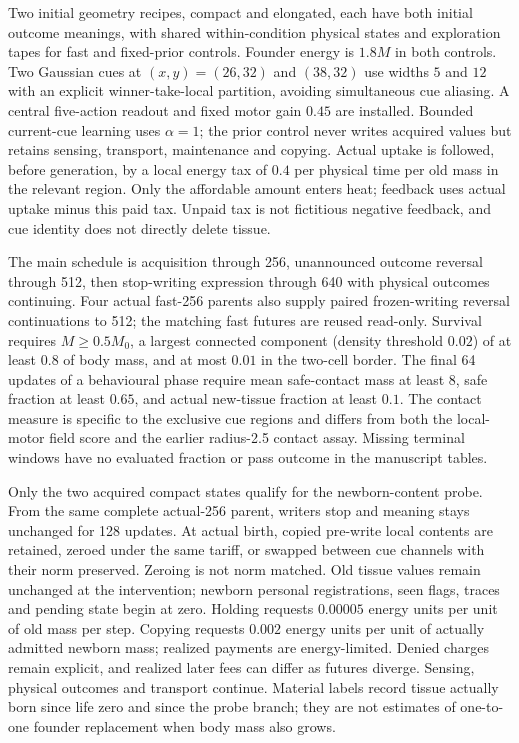 Two initial geometry recipes, compact and elongated, each have both initial outcome meanings, with shared within-condition physical states and exploration tapes for fast and fixed-prior controls. Founder energy is $1.8M$ in both controls. Two Gaussian cues at $(x,y)=(26,32)$ and $(38,32)$ use widths $5$ and $12$ with an explicit winner-take-local partition, avoiding simultaneous cue aliasing. A central five-action readout and fixed motor gain $0.45$ are installed. Bounded current-cue learning uses $\alpha=1$; the prior control never writes acquired values but retains sensing, transport, maintenance and copying. Actual uptake is followed, before generation, by a local energy tax of $0.4$ per physical time per old mass in the relevant region. Only the affordable amount enters heat; feedback uses actual uptake minus this paid tax. Unpaid tax is not fictitious negative feedback, and cue identity does not directly delete tissue.

The main schedule is acquisition through 256, unannounced outcome reversal through 512, then stop-writing expression through 640 with physical outcomes continuing. Four actual fast-256 parents also supply paired frozen-writing reversal continuations to 512; the matching fast futures are reused read-only. Survival requires $M\ge0.5M_0$, a largest connected component (density threshold $0.02$) of at least $0.8$ of body mass, and at most $0.01$ in the two-cell border. The final 64 updates of a behavioural phase require mean safe-contact mass at least 8, safe fraction at least $0.65$, and actual new-tissue fraction at least $0.1$. The contact measure is specific to the exclusive cue regions and differs from both the local-motor field score and the earlier radius-2.5 contact assay. Missing terminal windows have no evaluated fraction or pass outcome in the manuscript tables.

Only the two acquired compact states qualify for the newborn-content probe. From the same complete actual-256 parent, writers stop and meaning stays unchanged for 128 updates. At actual birth, copied pre-write local contents are retained, zeroed under the same tariff, or swapped between cue channels with their norm preserved. Zeroing is not norm matched. Old tissue values remain unchanged at the intervention; newborn personal registrations, seen flags, traces and pending state begin at zero. Holding requests $0.00005$ energy units per unit of old mass per step. Copying requests $0.002$ energy units per unit of actually admitted newborn mass; realized payments are energy-limited. Denied charges remain explicit, and realized later fees can differ as futures diverge. Sensing, physical outcomes and transport continue. Material labels record tissue actually born since life zero and since the probe branch; they are not estimates of one-to-one founder replacement when body mass also grows.

